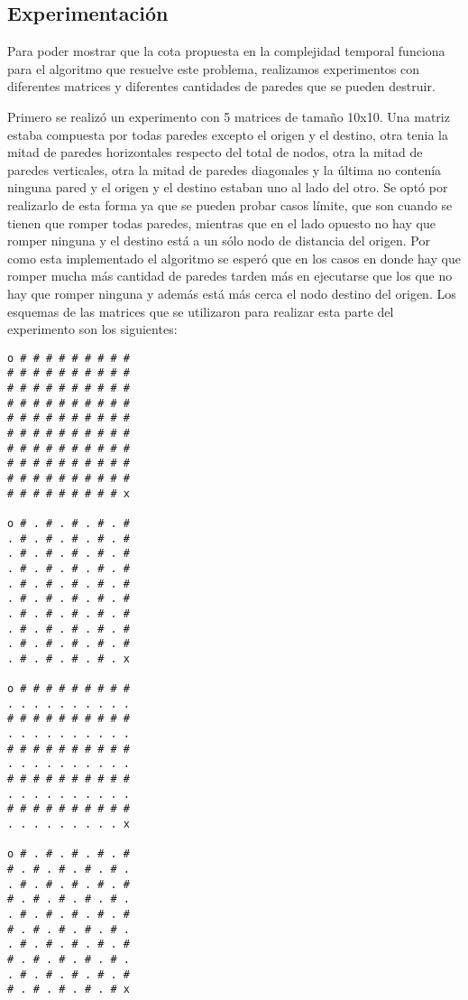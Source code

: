 \begin{itemize}
    \subsection{Experimentación}

	Para poder mostrar que la cota propuesta en la complejidad temporal funciona para el algoritmo que resuelve este problema, realizamos experimentos con diferentes matrices y diferentes cantidades de paredes que se pueden destruir.

  Primero se realizó un experimento con 5 matrices de tamaño 10x10. Una matriz estaba compuesta por todas paredes excepto el origen y el destino, otra tenia la mitad de paredes horizontales respecto del total de nodos, otra la mitad de paredes verticales, otra la mitad de paredes diagonales y la última no contenía ninguna pared y el origen y el destino estaban uno al lado del otro. Se optó por realizarlo de esta forma ya que se pueden probar casos límite, que son cuando se tienen que romper todas paredes, mientras que en el lado opuesto no hay que romper ninguna y el destino está a un sólo nodo de distancia del origen. Por como esta implementado el algoritmo se esperó que en los casos en donde hay que romper mucha más cantidad de paredes tarden más en ejecutarse que los que no hay que romper ninguna y además está más cerca el nodo destino del origen. Los esquemas de las matrices que se utilizaron para realizar esta parte del experimento son los siguientes:

 \begin{codesnippet}
            \begin{verbatim}
o # # # # # # # # #
# # # # # # # # # #
# # # # # # # # # #
# # # # # # # # # #
# # # # # # # # # #
# # # # # # # # # #
# # # # # # # # # #
# # # # # # # # # #
# # # # # # # # # #
# # # # # # # # # x

o # . # . # . # . #
. # . # . # . # . #
. # . # . # . # . #
. # . # . # . # . #
. # . # . # . # . #
. # . # . # . # . #
. # . # . # . # . #
. # . # . # . # . #
. # . # . # . # . #
. # . # . # . # . x

o # # # # # # # # #
. . . . . . . . . .
# # # # # # # # # #
. . . . . . . . . .
# # # # # # # # # #
. . . . . . . . . .
# # # # # # # # # #
. . . . . . . . . .
# # # # # # # # # #
. . . . . . . . . x

o # . # . # . # . #
# . # . # . # . # .
. # . # . # . # . #
# . # . # . # . # .
. # . # . # . # . #
# . # . # . # . # .
. # . # . # . # . #
# . # . # . # . # .
. # . # . # . # . #
# . # . # . # . # x


\end{verbatim}
\end{codesnippet}
\end{itemize}
